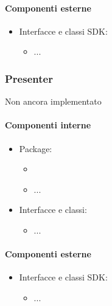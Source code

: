\documentclass[../Funzionalita.tex]{subfiles}
\begin{document}
			
			\paragraph*{Componenti esterne}
			
			\begin{itemize}
				\item Interfacce e classi SDK:
				\begin{itemize}
					\item[] ...
				\end{itemize}
			\end{itemize}
		
		
		\subsubsection{Presenter}
			Non ancora implementato
			\paragraph*{Componenti interne}
			\begin{itemize}
			
				\item Package:
				\begin{itemize}
					\item[]
					\item[] ...
				\end{itemize}
				
				\item Interfacce e classi:
				\begin{itemize}
					\item[] ...
				\end{itemize}
				
			\end{itemize}
			
			
			\paragraph*{Componenti esterne}
			
			\begin{itemize}
				\item Interfacce e classi SDK:
				\begin{itemize}
					\item[] \Activity ...
					
				\end{itemize}
			\end{itemize}
					
\end{document}
